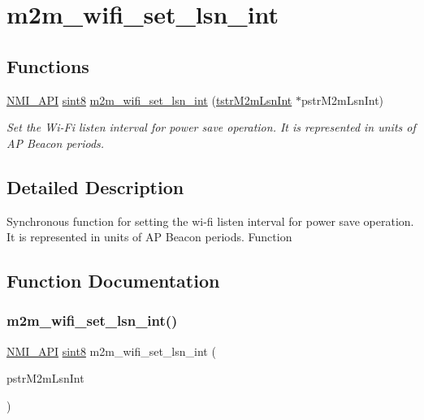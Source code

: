 \hypertarget{group__WifiSetLsnIntFn}{}\section{m2m\+\_\+wifi\+\_\+set\+\_\+lsn\+\_\+int}
\label{group__WifiSetLsnIntFn}
\subsection*{Functions}
\begin{DoxyCompactItemize}
\item 
\hyperlink{group__BSPDefine_gaecc0323d771e41ef81a76b5f12783e22}{N\+M\+I\+\_\+\+A\+PI} \hyperlink{group__DataT_gae35f10ffd0ac8dd2bc3e794da9bdfbc7}{sint8} \hyperlink{group__WifiSetLsnIntFn_gae97a08e321adfa528b5ec7a42788d3fc}{m2m\+\_\+wifi\+\_\+set\+\_\+lsn\+\_\+int} (\hyperlink{structtstrM2mLsnInt}{tstr\+M2m\+Lsn\+Int} $\ast$pstr\+M2m\+Lsn\+Int)
\begin{DoxyCompactList}\small\item\em Set the Wi-\/\+Fi listen interval for power save operation. It is represented in units of AP Beacon periods. \end{DoxyCompactList}\end{DoxyCompactItemize}


\subsection{Detailed Description}
Synchronous function for setting the wi-\/fi listen interval for power save operation. It is represented in units of AP Beacon periods. Function 

\subsection{Function Documentation}
\mbox{\label{group__WifiSetLsnIntFn_gae97a08e321adfa528b5ec7a42788d3fc}} 
\subsubsection{\texorpdfstring{m2m\+\_\+wifi\+\_\+set\+\_\+lsn\+\_\+int()}{m2m\_wifi\_set\_lsn\_int()}}
{\footnotesize\ttfamily \hyperlink{group__BSPDefine_gaecc0323d771e41ef81a76b5f12783e22}{N\+M\+I\+\_\+\+A\+PI} \hyperlink{group__DataT_gae35f10ffd0ac8dd2bc3e794da9bdfbc7}{sint8} m2m\+\_\+wifi\+\_\+set\+\_\+lsn\+\_\+int (\begin{DoxyParamCaption}\item[{\hyperlink{structtstrM2mLsnInt}{tstr\+M2m\+Lsn\+Int} $\ast$}]{pstr\+M2m\+Lsn\+Int }\end{DoxyParamCaption})}



